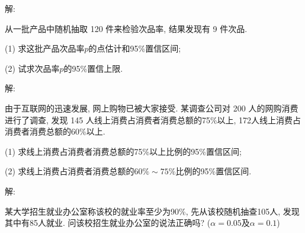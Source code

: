 \documentclass[standard]{ExBook}
\begin{document}
\begin{qitems}
\vspace{-5em}

    \begin{bbox}
解: 
    \end{bbox}

\vspace{-5em}

    \begin{bbox}
    \begin{shaded}
        \qitem
从一批产品中随机抽取 120 件来检验次品率, 结果发现有 9 件次品.

(1) 求这批产品次品率$p$的点估计和95\%置信区间;

(2) 试求次品率$p$的95\%置信上限.
    \end{shaded}
    \end{bbox}

\vspace{-5em}

    \begin{bbox}
解: 
    \end{bbox}

\vspace{-5em}

    \begin{bbox}
    \begin{shaded}
        \qitem
由于互联网的迅速发展, 网上购物已被大家接受. 某调查公司对 200 人的网购消费进行了调查, 发现 145 人线上消费占消费者消费总额的75\%以上, 172人线上消费占消费者消费总额的60\%以上.

(1) 求线上消费占消费者消费总额的75\%以上比例的95\%置信区间;

(2) 求线上消费占消费者消费总额的$60\%\sim75\%$比例的95\%置信区间.
    \end{shaded}
    \end{bbox}

\vspace{-5em}

    \begin{bbox}
解: 
    \end{bbox}

\vspace{-5em}

    \begin{bbox}
    \begin{shaded}
        \qitem
某大学招生就业办公室称该校的就业率至少为90\%, 先从该校随机抽查105人, 发现其中有85人就业. 问该校招生就业办公室的说法正确吗? ($\alpha=0.05$及$\alpha=0.1$)
    \end{shaded}
    \end{bbox}


\end{qitems}
\end{document}
